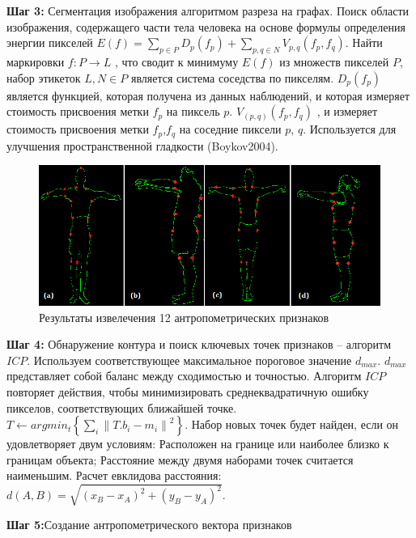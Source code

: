 \textbf{Шаг 3:} Сегментация изображения алгоритмом разреза на графах. Поиск области изображения, содержащего части тела человека на основе формулы определения энергии пикселей $E\left(f\right) = \sum_{p \in P}D_p\left(f_p\right)+\sum_{p,q \in N}V_{p,q}\left(f_p,f_q\right)$. Найти маркировки $f:P\rightarrow L$ , что сводит к минимуму $E\left(f\right)$ из множеств пикселей $P$, набор этикеток $L,N \in P$ является система соседства по пикселям. $D_p\left(f_p\right)$ является функцией, которая получена из данных наблюдений, и которая измеряет стоимость присвоения метки $f_p$ на пиксель $p$. $V_{\left(p,q\right)} \left(f_p,f_q\right)$ , и измеряет стоимость присвоения метки $f_p$,$f_q$ на соседние пиксели $p$, $q$. Используется для улучшения пространственной гладкости (Boykov2004).
\begin{figure}
\centering
\includegraphics [scale=0.4] {images/h15.png}
\begin{center}
\caption{Результаты извелечения 12 антропометрических признаков} \label{img7}
\end{center}
\end{figure}
\textbf{Шаг 4:} Обнаружение контура и поиск ключевых точек признаков – алгоритм $ICP$. Используем соответствующее максимальное пороговое значение $d_{max}$. $d_{max}$ представляет собой баланс между сходимостью и точностью. Алгоритм $ICP$ повторяет действия, чтобы минимизировать среднеквадратичную ошибку пикселов, соответствующих ближайшей точке. $T\leftarrow argmin_t\left\{\sum_i\left\|T.b_i - m_i\right\|^2\right\}.$ Набор новых точек будет найден, если он удовлетворяет двум условиям: Расположен на границе или наиболее близко к границам объекта; Расстояние между двумя наборами точек считается наименьшим. Расчет евклидова расстояния: $d\left(A,B\right) = \sqrt{\left(x_B - x_A\right)^2 + \left(y_B - y_A\right)^2}$.

\textbf{Шаг 5:}Создание антропометрического вектора признаков


